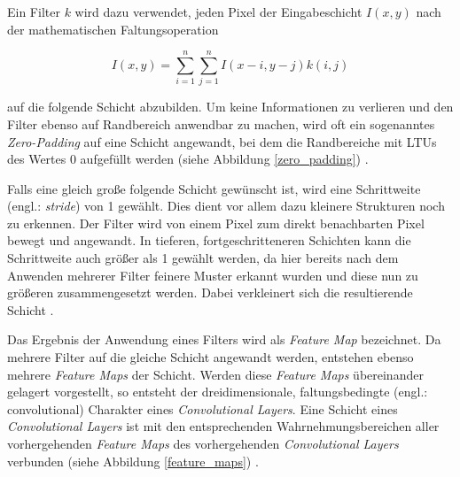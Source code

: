 Ein Filter $k$ wird dazu verwendet, jeden Pixel der Eingabeschicht $I(x,y)$ nach der mathematischen Faltungsoperation 

\begin{equation}
I(x,y) = \sum_{i=1}^{n}\sum_{j=1}^{n} I(x-i, y-j)k(i,j)
\end{equation}

auf die folgende Schicht abzubilden. Um keine Informationen zu verlieren und den Filter ebenso auf Randbereich anwendbar zu machen, wird oft ein sogenanntes \textit{Zero-Padding} auf eine Schicht angewandt, bei dem die Randbereiche mit LTUs des Wertes 0 aufgefüllt werden (siehe Abbildung \ref{zero_padding}) \cite{AurelienGeron.2018}.

Falls eine gleich große folgende Schicht gewünscht ist, wird eine Schrittweite (engl.: \textit{stride}) von 1 gewählt. Dies dient vor allem dazu kleinere Strukturen noch zu erkennen. Der Filter wird von einem Pixel zum direkt benachbarten Pixel bewegt und angewandt. In tieferen, fortgeschritteneren Schichten kann die Schrittweite auch größer als 1 gewählt werden, da hier bereits nach dem Anwenden mehrerer Filter feinere Muster erkannt wurden und diese nun zu größeren zusammengesetzt werden. Dabei verkleinert sich die resultierende Schicht \cite{AurelienGeron.2018}.

Das Ergebnis der Anwendung eines Filters wird als \textit{Feature Map} bezeichnet. Da mehrere Filter auf die gleiche Schicht angewandt werden, entstehen ebenso mehrere \textit{Feature Maps} der Schicht. Werden diese \textit{Feature Maps} übereinander gelagert vorgestellt, so entsteht der dreidimensionale, \glqq faltungsbedingte\grqq{} (engl.: convolutional) Charakter eines \textit{Convolutional Layers}. Eine Schicht eines \textit{Convolutional Layers} ist mit den entsprechenden Wahrnehmungsbereichen aller vorhergehenden \textit{Feature Maps} des vorhergehenden \textit{Convolutional Layers} verbunden (siehe Abbildung \ref{feature_maps}) \cite{AurelienGeron.2018}.


